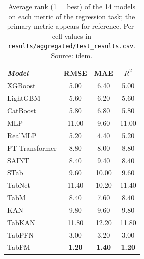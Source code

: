 \begin{table}[htbp]
\centering
\small
\caption[Secondary metrics --- regression task]{Average rank (1 = best) of the 14 models on each metric of the regression task; the primary metric appears for reference. Per-cell values in \texttt{results/\allowbreak aggregated/\allowbreak test\_\allowbreak results.\allowbreak csv}. Source: idem.}
\label{tab:app-secundarias-regression}
\begin{tabular}{lccc}
\toprule
\emph{Model} & RMSE & MAE & $R^{2}$ \\
\midrule
XGBoost & 5.00 & 6.40 & 5.00 \\
LightGBM & 5.60 & 6.20 & 5.60 \\
CatBoost & 5.80 & 6.80 & 5.80 \\
MLP & 11.00 & 9.60 & 11.00 \\
RealMLP & 5.20 & 4.40 & 5.20 \\
FT-Transformer & 8.80 & 8.00 & 8.80 \\
SAINT & 8.40 & 9.40 & 8.40 \\
STab & 9.60 & 10.00 & 9.60 \\
TabNet & 11.40 & 10.20 & 11.40 \\
TabM & 8.40 & 7.60 & 8.40 \\
KAN & 9.80 & 9.60 & 9.80 \\
TabKAN & 11.80 & 12.20 & 11.80 \\
TabPFN & 3.00 & 3.20 & 3.00 \\
TabFM & \textbf{1.20} & \textbf{1.40} & \textbf{1.20} \\
\bottomrule
\end{tabular}
\end{table}

